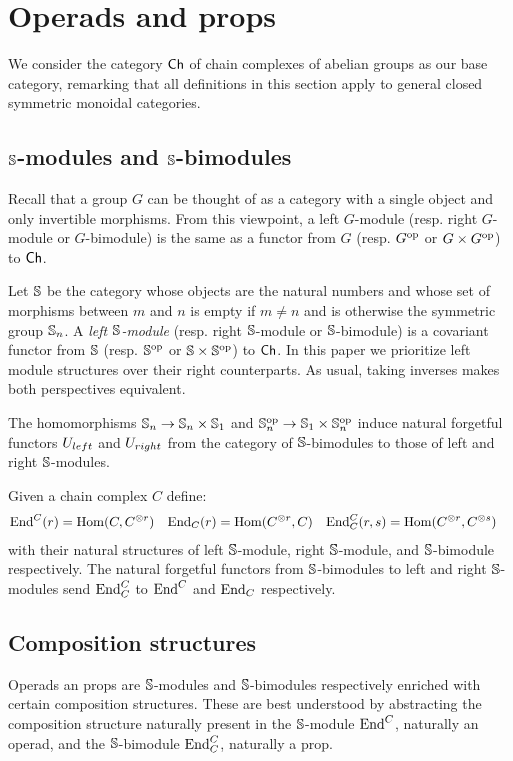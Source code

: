 \section{Operads and props}

We consider the category $\Ch$ of chain complexes of abelian groups as our base category, remarking that all definitions in this section apply to general closed symmetric monoidal categories.

\subsection{$\S$-modules and $\S$-bimodules}
Recall that a group $G$ can be thought of as a category with a single object and only invertible morphisms. From this viewpoint, a left $G$-module (resp. right $G$-module or $G$-bimodule) is the same as a functor from $G$ (resp. $G^\op$ or $G \times G^\op$) to $\Ch$.

Let $\S$ be the category whose objects are the natural numbers and whose set of morphisms between $m$ and $n$ is empty if $m \neq n$ and is otherwise the symmetric group $\S_n$.
A \textit{left $\S$-module} (resp. right $\S$-module or $\S$-bimodule) is a covariant functor from $\S$ (resp. $\S^\op$ or $\S \times \S^\op$) to $\Ch$.
In this paper we prioritize left module structures over their right counterparts. As usual, taking inverses makes both perspectives equivalent.

The homomorphisms $\S_n \to \S_n \times \S_1$ and $\S_n^\op \to \S_1 \times \S_n^\op$ induce natural forgetful functors $\Uleft$ and $\Uright$ from the category of $\S$-bimodules to those of left and right $\S$-modules.

Given a chain complex $C$ define:
\begin{align*}
\End^C(r) &= \Hom(C, C^{\otimes r})
& \End_C(r) &= \Hom(C^{\otimes r}, C)
&\End^C_C(r, s) &= \Hom(C^{\otimes r}, C^{\otimes s})
\end{align*}
with their natural structures of left $\S$-module, right $\S$-module, and $\S$-bimodule respectively.
The natural forgetful functors from $\S$-bimodules to left and right $\S$-modules send $\End^C_C$ to $\End^C$ and $\End_C$ respectively.

\subsection{Composition structures}

Operads an props are $\S$-modules and \mbox{$\S$-bimodules} respectively enriched with certain composition structures. These are best understood by abstracting the composition structure naturally present in the $\S$-module $\End^C$, naturally an operad, and the $\S$-bimodule $\End^C_C$, naturally a prop.

